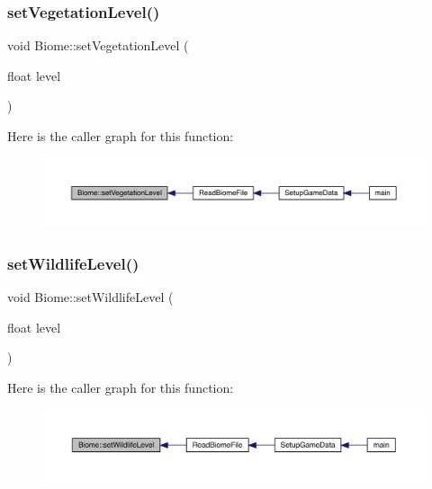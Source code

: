 \subsubsection{\texorpdfstring{set\+Vegetation\+Level()}{setVegetationLevel()}}
{\footnotesize\ttfamily void Biome\+::set\+Vegetation\+Level (\begin{DoxyParamCaption}\item[{float}]{level }\end{DoxyParamCaption})}

Here is the caller graph for this function\+:
\nopagebreak
\begin{figure}[H]
\begin{center}
\leavevmode
\includegraphics[width=350pt]{class_biome_adbe071450d7411ddd3f886b1c84c2029_icgraph}
\end{center}
\end{figure}
\mbox{\label{class_biome_afe05b01787008c396ccad3ffd7e6d6cd}} 
\subsubsection{\texorpdfstring{set\+Wildlife\+Level()}{setWildlifeLevel()}}
{\footnotesize\ttfamily void Biome\+::set\+Wildlife\+Level (\begin{DoxyParamCaption}\item[{float}]{level }\end{DoxyParamCaption})}

Here is the caller graph for this function\+:
\nopagebreak
\begin{figure}[H]
\begin{center}
\leavevmode
\includegraphics[width=350pt]{class_biome_afe05b01787008c396ccad3ffd7e6d6cd_icgraph}
\end{center}
\end{figure}


